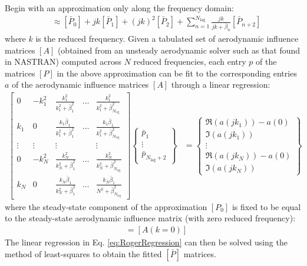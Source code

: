 Begin with an approximation only along the frequency domain:
\begin{align}
    [A(jk)] &\approx [\bar{P}_0] + jk [\bar{P}_1] + (jk)^2 [\bar{P}_2] + \sum_{n=1}^{N_\text{lag}} \frac{jk}{jk+\bar{\beta}_n} [\bar{P}_{n+2}]
\end{align}
where $k$ is the reduced frequency. Given a tabulated set of aerodynamic influence matrices $[A]$ (obtained from an unsteady aerodynamic solver such as that found in NASTRAN) computed across $N$ reduced frequencies, each entry $p$ of the matrices $[P]$ in the above approximation can be fit to the corresponding entries $a$ of the aerodynamic influence matrices $[A]$ through a linear regression:
\begin{align}
	\label{eq:RogerRegression}
    \begin{bmatrix}
        0 & -k_1^2 & \frac{k_1^2}{k_1^2 + \bar{\beta}_1^2} & \dots & \frac{k_1^2}{k_1^2 + \bar{\beta}_{N_\text{lag}}^2} \\
	    k_1 & 0 & \frac{k_1 \bar{\beta}_1}{k_1^2 + \bar{\beta}_1^2} & \dots & \frac{k_1 \bar{\beta}_1}{k_1^2 + \bar{\beta}_{N_\text{lag}}^2} \\
	    \vdots & \vdots & \vdots & & \vdots \\
        0 & -k_N^2 & \frac{k_N^2}{k_N^2 + \bar{\beta}_1^2} & \dots & \frac{k_N^2}{k_N^2 + \bar{\beta}_{N_\text{lag}}^2} \\
	    k_N & 0 & \frac{k_N \bar{\beta}_1}{k_N^2 + \bar{\beta}_1^2} & \dots & \frac{k_N \bar{\beta}_1}{N^2 + \bar{\beta}_{N_\text{lag}}^2}	    
    \end{bmatrix}
    \begin{Bmatrix} \bar{p}_1 \\ \vdots \\ \bar{p}_{N_\text{lag}+2} \end{Bmatrix}
    &=
    \begin{Bmatrix}
	    \Re(a(jk_1)) - a(0) \\
	    \Im(a(jk_1)) \\
	    \vdots \\
	    \Re(a(jk_N)) - a(0) \\
	    \Im(a(jk_N))	    
    \end{Bmatrix}
\end{align}
where the steady-state component of the approximation $[P_0]$ is fixed to be equal to the steady-state aerodynamic influence matrix (with zero reduced frequency):
\begin{align}
    [\bar{P}_0] &= [A(k=0)]
\end{align}
The linear regression in Eq. \ref{eq:RogerRegression} can then be solved using the method of least-squares to obtain the fitted $[\bar{P}]$ matrices.

